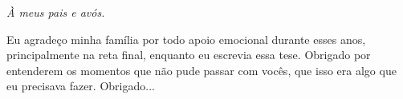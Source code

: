 \imprimircapa


\setcounter{page}{3}
\imprimirfolhaderosto*


\begin{fichacatalografica}
    \vspace*{\fill}
    \begin{center}
        
    \end{center}
    \vspace*{\fill}
\end{fichacatalografica}

\vspace*{\fill}
\begin{center}
    
\end{center}
\vspace*{\fill}
\cleardoublepage


\begin{dedicatoria}
    \vspace*{\fill}
    \centering
    \noindent
    \textit{À meus pais e avós.}
    \vspace*{\fill}
\end{dedicatoria}

\begin{agradecimentos}
    Eu agradeço minha família por todo apoio emocional durante esses anos, principalmente na reta final, enquanto eu escrevia essa tese. Obrigado por entenderem os momentos que não pude passar com vocês, que isso era algo que eu precisava fazer.
    Obrigado...
\end{agradecimentos}


